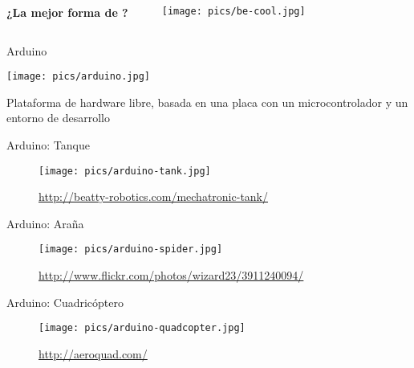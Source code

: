 \documentclass[14pt]{beamer}
\begin{document}
\begin{frame}{}
  \begin{columns}
    \begin{block}{}\centering\Large\bf
      ¿La mejor forma de ?
    \end{block}
    \begin{center}
    \end{center}
    \texttt{[image: pics/be-cool.jpg]}
  \end{columns}
\end{frame}

\begin{frame}{Arduino}
  \begin{center}
  \texttt{[image: pics/arduino.jpg]}
  \end{center}
  \vspace{-0.5cm}
  \begin{block}{}\centering
    Plataforma de hardware libre, basada en una placa con un
    microcontrolador y un entorno de desarrollo
  \end{block}
\end{frame}

\begin{frame}{Arduino: Tanque}
  \begin{figure}
    \centering
    \texttt{[image: pics/arduino-tank.jpg]}
    \caption*{\small \url{http://beatty-robotics.com/mechatronic-tank/}}
  \end{figure}
\end{frame}

\begin{frame}{Arduino: Araña}
  \begin{figure}
    \centering
    \texttt{[image: pics/arduino-spider.jpg]}
    \caption*{\small \url{http://www.flickr.com/photos/wizard23/3911240094/}}
  \end{figure}
\end{frame}

\begin{frame}{Arduino: Cuadricóptero}
  \begin{figure}
    \centering
    \texttt{[image: pics/arduino-quadcopter.jpg]}
    \caption*{\small \url{http://aeroquad.com/}}
  \end{figure}
\end{frame}
\end{document}
